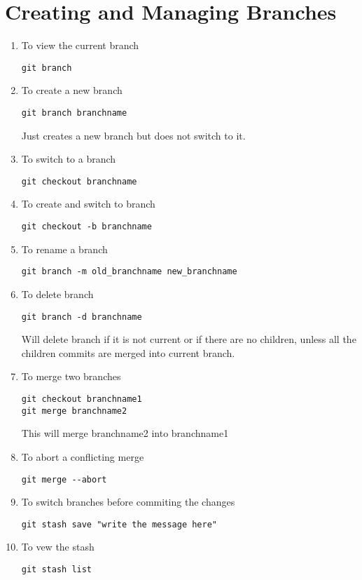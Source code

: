 \documentclass[paper=a4, fontsize=12pt]{scrartcl}
\begin{document}
\section*{Creating and Managing Branches}
\begin{enumerate}
\item To view the current branch
\begin{lstlisting}
git branch
\end{lstlisting}
\item To create a new branch
\begin{lstlisting}
git branch branchname
\end{lstlisting}
Just creates a new branch but does not switch to it.
\item To switch to a branch
\begin{lstlisting}
git checkout branchname
\end{lstlisting}
\item To create and switch to branch
\begin{lstlisting}
git checkout -b branchname
\end{lstlisting}
\item To rename a branch
\begin{lstlisting}
git branch -m old_branchname new_branchname
\end{lstlisting}
\item To delete branch
\begin{lstlisting}
git branch -d branchname
\end{lstlisting}
Will delete branch if it is not current or if there are no children, unless all the children commits are merged into current branch.
\item To merge two branches
\begin{lstlisting}
git checkout branchname1
git merge branchname2
\end{lstlisting}
This will merge branchname2 into branchname1
\item To abort a conflicting merge
\begin{lstlisting}
git merge --abort
\end{lstlisting}
\item To switch branches before commiting the changes
\begin{lstlisting}
git stash save "write the message here"
\end{lstlisting}
\item To vew the stash
\begin{lstlisting}
git stash list
\end{lstlisting}

\end{enumerate}
\end{document}

